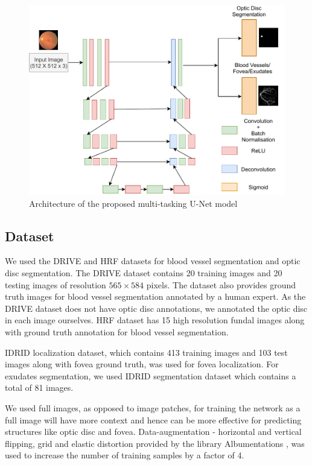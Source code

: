 \documentclass{article}
\begin{document}
\begin{figure}[!ht]
  \centering
  \includegraphics[width=0.9\linewidth]{images/UnetArch.pdf}
  \caption{Architecture of the proposed multi-tasking U-Net model}
  \label{unet_combined}
\end{figure}

\vspace{-0.2in}
\subsection{Dataset}
We used the DRIVE \cite{drive} and HRF \cite{budai2013robust}  datasets for blood vessel segmentation and optic disc segmentation.
The DRIVE dataset contains 20 training images and 20 testing images of resolution $565 \times 584$ pixels.
The dataset also provides ground truth images for blood vessel segmentation annotated by a human expert.
As the DRIVE dataset does not have optic disc annotations, we annotated the optic disc in each image ourselves.
HRF dataset has 15 high resolution fundal images along with ground truth annotation for blood vessel segmentation.

IDRID \cite{h25w98-18} localization dataset, which contains  413 training images and 103 test images along with fovea ground truth, was used for fovea localization.
For exudates segmentation, we used IDRID \cite{h25w98-18} segmentation dataset which contains a total of 81 images.

We used full images, as opposed to image patches, for training the network  as a full image will have more context and hence can be more effective for predicting structures like optic disc and fovea.
Data-augmentation - horizontal and vertical flipping, grid and elastic distortion provided by the library Albumentations \cite{buslaev2020albumentations},
was used  to increase the number of training samples by a factor of 4.
\end{document}
